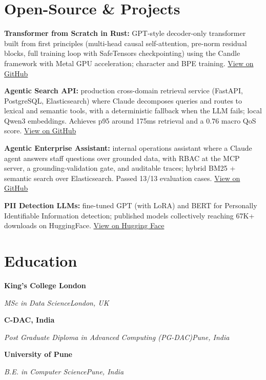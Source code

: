 \documentclass[10pt,a4paper]{article}
\newcommand{\entry}[4]{%
  {\color{company}\bfseries #1}\hfill {\color{muted}#2}\par
  \vspace{1pt}
  {\itshape #3}\hfill {\color{muted}\itshape #4}\par
  \vspace{3pt}%
}
\begin{document}
\section{Open-Source \& Projects}
\begin{tight}
  \item \textbf{Transformer from Scratch in Rust:} GPT-style decoder-only transformer built from first principles (multi-head causal self-attention, pre-norm residual blocks, full training loop with SafeTensors checkpointing) using the Candle framework with Metal GPU acceleration; character and BPE training. \href{https://github.com/abhijeetscode/transformer-rust}{View on GitHub}
  \item \textbf{Agentic Search API:} production cross-domain retrieval service (FastAPI, PostgreSQL, Elasticsearch) where Claude decomposes queries and routes to lexical and semantic tools, with a deterministic fallback when the LLM fails; local Qwen3 embeddings. Achieves p95 around 175ms retrieval and a 0.76 macro QoS score. \href{https://github.com/abhijeetscode/search-agent}{View on GitHub}
  \item \textbf{Agentic Enterprise Assistant:} internal operations assistant where a Claude agent answers staff questions over grounded data, with RBAC at the MCP server, a grounding-validation gate, and auditable traces; hybrid BM25 + semantic search over Elasticsearch. Passed 13/13 evaluation cases. \href{https://github.com/abhijeetscode/Agentic-Enterprise-Assistant}{View on GitHub}
  \item \textbf{PII Detection LLMs:} fine-tuned GPT (with LoRA) and BERT for Personally Identifiable Information detection; published models collectively reaching 67K+ downloads on HuggingFace. \href{https://huggingface.co/ab-ai/pii_model}{View on Hugging Face}
\end{tight}

\section{Education}
\entry{King's College London}{}{MSc in Data Science}{London, UK}
\vspace{-3pt}
\entry{C-DAC, India}{}{Post Graduate Diploma in Advanced Computing (PG-DAC)}{Pune, India}
\vspace{-3pt}
\entry{University of Pune}{}{B.E. in Computer Science}{Pune, India}
\end{document}

